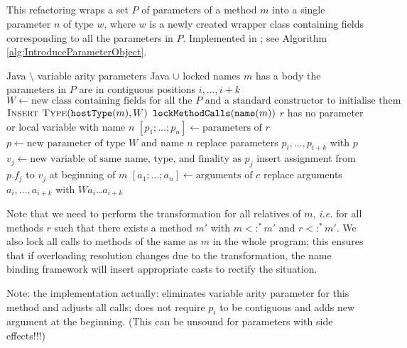 \subsection{}
This refactoring wraps a set $P$ of parameters of a method $m$ into a single parameter $n$ of type $w$, where $w$ is a newly created wrapper class containing fields corresponding to all the parameters in $P$. Implemented in ; see Algorithm \ref{alg:IntroduceParameterObject}.

\begin{algorithm}
\caption{$\refactoring{Introduce Parameter Object}(m : \type{Method}, P : \settp{\type{Parameter}}, w : \settp{Name}, n : \settp{Name})$}
\label{alg:IntroduceParameterObject}
\begin{algorithmic}[1]
\REQUIRE Java $\setminus$ variable arity parameters
\ENSURE Java $\cup$ locked names
\medskip
\STATE \assert $m$ has a body
\STATE \assert the parameters in $P$ are in contiguous positions $i, \ldots, i+k$
\STATE $W \leftarrow \text{new class containing fields for all the $P$ and a standard constructor to initialise them}$
\STATE $\textsc{Insert Type}(\text{\texttt{hostType}}(m), W)$
\STATE $\text{\texttt{lockMethodCalls}}(\text{\texttt{name}}(m))$
  \STATE \assert $r$ has no parameter or local variable with name $n$
  \STATE $[p_1;\ldots;p_n] \leftarrow \text{parameters of $r$}$
  \STATE $p \leftarrow \text{new parameter of type $W$ and name $n$}$
  \STATE replace parameters $p_i, \ldots, p_{i+k}$ with $p$
    \STATE $v_j \leftarrow \text{new variable of same name, type, and finality as $p_j$}$
    \STATE insert assignment from $p.f_j$ to $v_j$ at beginning of $m$
  \ENDFOR
    \STATE $[a_1;\ldots;a_n] \leftarrow \text{arguments of $c$}$
    \STATE replace arguments $a_i, \ldots, a_{i+k}$ with $W$\code{(}$a_i$\code{,}\ldots\code{,}$a_{i+k}$\code{)}
  \ENDFOR
\ENDFOR
\end{algorithmic}
\end{algorithm}

Note that we need to perform the transformation for all relatives of $m$, \emph{i.e.} for all methods $r$ such that there exists a method $m'$ with $m<:^*m'$ and $r<:^*m'$. We also lock all calls to methods of the same as $m$ in the whole program; this ensures that if overloading resolution changes due to the transformation, the name binding framework will insert appropriate casts to rectify the situation.

Note: the implementation actually: eliminates variable arity parameter for this method and adjusts all calls; does not require $p_i$ to be contiguous and adds new argument at the beginning. (This can be unsound for parameters with side effects!!!)
